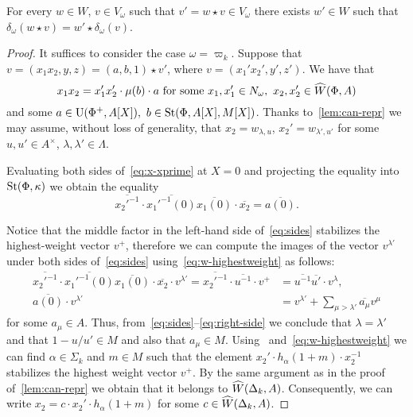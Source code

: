 \begin{prop}
 For every $w \in W$, $v \in V_\omega$ such that $v' = w \star v \in V_\omega$ there exists $w' \in W$ such that
  $\delta_\omega(w \star v) = w' \star \delta_\omega(v)$.
\end{prop}
\begin{proof}
 It suffices to consider the case $\omega = \varpi_k$.
 Suppose that $v = (x_1 x_2, y, z) = (a, b, 1) \star v'$, where $v = (x_1' x_2', y', z')$.
 We have that
 \begin{equation}\label{eq:x-xprime} x_1 x_2 = x_1' x_2' \cdot \mu(b) \cdot a  \text{ for some }x_1, x_1' \in N_\omega,\ x_2, x_2' \in \widehat{W}(\Phi, A) \end{equation}
 and some $a \in \operatorname{U}(\Phi^+, A[X]),\ b \in \operatorname{St}(\Phi, A[X], M[X])$.
 Thanks to~\cref{lem:can-repr} we may assume, without loss of generality, that $x_2 = w_{\lambda, u}$, $x_2' = w_{\lambda', u'}$
 for some $u, u' \in A^\times$, $\lambda, \lambda' \in \Lambda$.

 Evaluating both sides of~\eqref{eq:x-xprime} at $X=0$ and projecting the equality into $\operatorname{St}(\Phi, \kappa)$ we obtain the equality
 \begin{equation} \label{eq:sides}
 \overline{{x_2'}^{-1}} \cdot \overline{{x_1'}^{-1}(0)} \overline{x_1(0)} \cdot \overline{x_2} = \overline{a(0)}.
 \end{equation}

 Notice that the middle factor in the left-hand side of~\eqref{eq:sides} stabilizes the highest-weight vector $v^+$,
 therefore we can compute the images of the vector $v^{\lambda'}$ under both sides of~\eqref{eq:sides} using~\eqref{eq:w-highestweight} as follows:
 \begin{align} \overline{{x_2'}^{-1}} \cdot \overline{{x_1'}^{-1}(0)} \overline{x_1(0)} \cdot \overline{x_2} \cdot v^{\lambda'} = \overline{{x_2'}^{-1}} \cdot \overline{{u}^{-1}} \cdot v^+ &= \overline{u^{-1}}\overline{u'} \cdot v^\lambda, \\
               \overline{a(0)} \cdot v^{\lambda'} &= v^{\lambda'} + \sum_{\mu > \lambda'} \overline{a_\mu} v^\mu \label{eq:right-side} \end{align}
 for some $a_\mu \in A$.
 Thus, from~\eqref{eq:sides}--\eqref{eq:right-side} we conclude that $\lambda = \lambda'$ and that $1 - u/u' \in M$ and also that $a_\mu \in M$.
 Using~\cite[Lemma~7]{V00} and~\eqref{eq:w-highestweight} we can find $\alpha \in \Sigma_k$ and $m \in M$ such that the element $x_2' \cdot h_\alpha(1+m) \cdot x_2^{-1}$ stabilizes the highest weight vector $v^+$.
 By the same argument as in the proof of~\cref{lem:can-repr} we obtain that it belongs to $\widehat{W}(\Delta_k, A)$.
 Consequently, we can write $x_2 = c \cdot x_2' \cdot h_\alpha(1+m)$ for some $c \in \widehat{W}(\Delta_k, A)$.



\end{proof}
